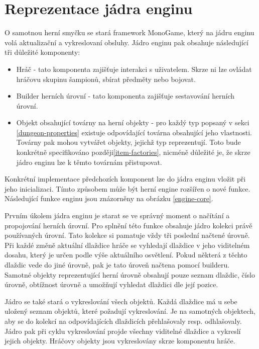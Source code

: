 \section{Reprezentace jádra enginu}\label{engine-core-section}

O samotnou herní smyčku se stará framework MonoGame, který na jádru enginu volá aktualizační a vykreslovaní obsluhy.
Jádro enginu pak obsahuje následující tři důležité komponenty:
\begin{itemize}
\item Hráč - tato komponenta zajišťuje interakci s uživatelem. Skrze ni lze ovládat hráčovu skupinu šampionů, sbírat předměty nebo bojovat.
\item Builder herních úrovní - tato komponenta zajišťuje sestavování herních úrovní.
\item Objekt obsahující továrny na herní objekty - pro každý typ popsaný v sekci \ref{dungeon-properties} existuje odpovídající
	továrna obsahující jeho vlastnosti. Továrny pak mohou vytvářet objekty, jejichž typ reprezentují. Toto bude konkrétně
	specifikováno později\vref{item-factories}, nicméně důležité je, že skrze jádro enginu lze k těmto továrnám přistupovat.
\end{itemize}
Konkrétní implementace předchozích komponent lze do jádra enginu vložit při jeho inicializaci. Tímto způsobem může být herní 
engine rozšířen o nové funkce. Následující funkce enginu jsou znázorněny na obrázku \ref{engine-core}.

Prvním úkolem jádra enginu je starat se ve správný moment o načítání a propojování herních úrovní. Pro splnění této funkce
obsahuje jádro kolekci právě používaných úrovní. Tato kolekce si pamatuje vždy tři poslední načtené úrovně.
Při každé změně aktuální dlaždice hráče se vyhledají dlaždice v jeho viditelném dosahu, který je určen podle výše aktuálního osvětlení.
Pokud některá z těchto dlaždic vede do jiné úrovně, pak je tato úroveň načtena pomocí builderu. Samotné objekty reprezentující herní úrovně 
obsahují pouze seznam dlaždic, číslo úrovně, obtížnost úrovně a umožňují vyhledat dlaždici dle její pozice. 

Jádro se také stará o vykreslování všech objektů. Každá dlaždice má u sebe uložený seznam objektů, které požadují vykreslování.
Je na samotných objektech, aby se do kolekcí na odpovídajících dlaždicích přehlašovaly resp. odhlašovaly. Jádro pak při 
cyklu vykreslování projde všechny viditelné dlaždice a vykreslí jejich objekty. Hráčovy objekty jsou vykreslovány skrze komponentu hráče.

